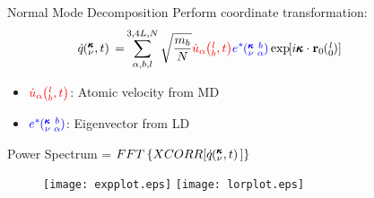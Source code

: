 \documentclass{beamer}
\newcommand{\EXP}[1]{\exp\mspace{-5.0mu}\left[#1\right]\mspace{-3.0mu}}
\newcommand{\lO}{\mspace{-4.0mu}\left(\mspace{-8.0mu}
\begin{smallmatrix}&l \\&0\end{smallmatrix}
\mspace{-3.0mu}\right)}
\newcommand{\kvba}{\mspace{-4.0mu}\left(\mspace{-8.0mu}
\begin{smallmatrix} &\pmb{\kappa} &b \\ &\nu &\alpha\end{smallmatrix}
\mspace{-3.0mu}\right)}
\newcommand{\kvt}{\mspace{-4.0mu}\left(\mspace{-8.0mu}
\begin{smallmatrix}&\pmb{\kappa} \\&\nu\end{smallmatrix}
\mspace{-2.0mu},t\right)}
\newcommand{\kvw}{\mspace{-4.0mu}\left(\mspace{-8.0mu}
\begin{smallmatrix}&\pmb{\kappa} \\&\nu\end{smallmatrix}
\mspace{-2.0mu},\omega\right)}
\newcommand{\kv}{\mspace{-4.0mu}\left(\mspace{-8.0mu}
\begin{smallmatrix}&\pmb{\kappa} \\&\nu\end{smallmatrix}
\mspace{-3.0mu}\right)}
\newcommand{\lbt}{\mspace{-4.0mu}\left(\mspace{-8.0mu}
\begin{smallmatrix}&l \\&b\end{smallmatrix}\mspace{-2.0mu},t\right)}
\begin{document}
\begin{frame}{Normal Mode Decomposition}
Perform coordinate transformation:
\begin{equation}\label{EQ:NMD:qdot}
\begin{split}
\hspace*{-1cm}\dot{q}\kvt{}{}{}=&\sum_{\alpha, b, l}^{3,4L,N}\sqrt{\frac{m_b}{N}}\textcolor{red}{\dot{u}_{\alpha}\lbt}\textcolor{blue}{e^*\kvba}\EXP{i\pmb{\kappa}\cdot\mathbf{r}_0\lO}
\end{split}
\end{equation}
\hspace*{-2cm}
\vspace*{-0.5cm}
\begin{itemize}
\item $\textcolor{red}{\dot{u}_{\alpha}\lbt}$: Atomic velocity from MD
\item $\textcolor{blue}{e^*\kvba}$: Eigenvector from LD
\end{itemize}
Power Spectrum = $FFT\left \{XCORR[\dot{q}\kvt{}{}{}] \right\} $
\begin{figure}%
\begin{center}
\texttt{[image: expplot.eps]} \hspace{0.05\textwidth}%
\texttt{[image: lorplot.eps]} \\[2em]
\end{center}
\end{figure}
\vspace*{-1cm}
\end{frame}
\end{document}
